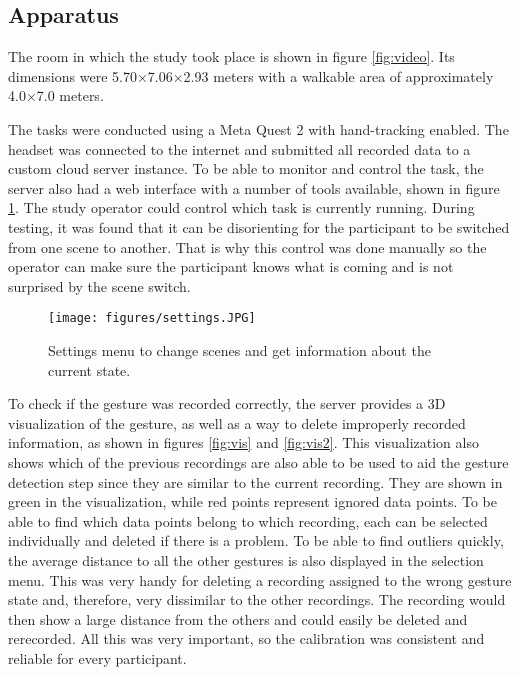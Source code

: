 \subsection{Apparatus}

The room in which the study took place is shown in figure \ref{fig:video}. Its dimensions were 5.70×7.06×2.93 meters with a walkable area of approximately 4.0×7.0 meters.

The tasks were conducted using a Meta Quest 2 with hand-tracking enabled. The headset was connected to the internet and submitted all recorded data to a custom cloud server instance. To be able to monitor and control the task, the server also had a web interface with a number of tools available, shown in figure \ref{fig:settings}. The study operator could control which task is currently running. During testing, it was found that it can be disorienting for the participant to be switched from one scene to another. That is why this control was done manually so the operator can make sure the participant knows what is coming and is not surprised by the scene switch.

\begin{figure}[!ht]
    \centering
    \texttt{[image: figures/settings.JPG]}
    \caption{Settings menu to change scenes and get information about the current state.}
    \label{fig:settings}
\end{figure}

To check if the gesture was recorded correctly, the server provides a 3D visualization of the gesture, as well as a way to delete improperly recorded information, as shown in figures \ref{fig:vis} and  \ref{fig:vis2}. This visualization also shows which of the previous recordings are also able to be used to aid the gesture detection step since they are similar to the current recording. They are shown in green in the visualization, while red points represent ignored data points. To be able to find which data points belong to which recording, each can be selected individually and deleted if there is a problem. To be able to find outliers quickly, the average distance to all the other gestures is also displayed in the selection menu. This was very handy for deleting a recording assigned to the wrong gesture state and, therefore, very dissimilar to the other recordings. The recording would then show a large distance from the others and could easily be deleted and rerecorded. All this was very important, so the calibration was consistent and reliable for every participant.

